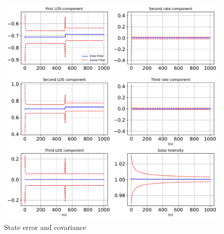 \begin{figure}[htbp]\centerline{\includegraphics[height=0.9\textwidth, keepaspectratio]{AutoTeX/StatesPlot}}\caption{State error and covariance}\label{fig:StatesPlot}\end{figure}